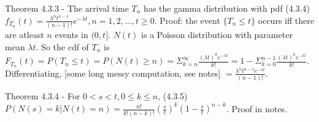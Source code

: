 \documentclass{article}
\begin{document}
Theorem 4.3.3 - The arrival time $T_n$ has the gamma distribution with pdf (4.3.4) $f_{T_n}(t) = \frac{\lambda^n t^{n-1}}{(n-1)!} e^{-\lambda t}, n = 1, 2, \dots, t \ge 0$. Proof: the event $\{T_n \le t\}$ occurs iff there are atleast $n$ events in $(0, t]$. $N(t)$ is a Poisson distribution with parameter mean $\lambda t$. So the cdf of $T_n$ is $F_{T_n}(t) = P(T_n \le t) = P(N(t) \ge n) = \Sigma_{k = n}^\infty \frac{(\lambda t)^k e^{-\lambda t}}{k!} = 1 - \Sigma_{k=0}^{n-1} \frac{(\lambda t)^k e^{-\lambda t}}{k!}$. Differentiating, [some long messy computation, see notes] $= \frac{\lambda^n t^{n-1} e^{-\lambda t}}{(n-1)!}$.

Theorem 4.3.4 - For $0 < s < t, 0 \le k \le n$, (4.3.5) $P(N(s) = k|N(t) = n) = \frac{n!}{k!(n-k)!} (\frac{s}{t})^k (1 - \frac{s}{t})^{n-k}$. Proof in notes.
\end{document}
